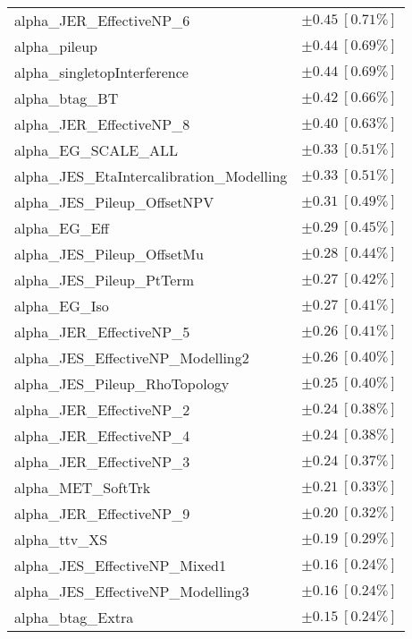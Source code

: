 \begin{table}
\begin{center}
\begin{tabular*}{\textwidth}{@{\extracolsep{\fill}}lc}
alpha\_JER\_EffectiveNP\_6         & $\pm 0.45\ [0.71\%] $       \\
alpha\_pileup         & $\pm 0.44\ [0.69\%] $       \\
alpha\_singletopInterference         & $\pm 0.44\ [0.69\%] $       \\
alpha\_btag\_BT         & $\pm 0.42\ [0.66\%] $       \\
alpha\_JER\_EffectiveNP\_8         & $\pm 0.40\ [0.63\%] $       \\
alpha\_EG\_SCALE\_ALL         & $\pm 0.33\ [0.51\%] $       \\
alpha\_JES\_EtaIntercalibration\_Modelling         & $\pm 0.33\ [0.51\%] $       \\
alpha\_JES\_Pileup\_OffsetNPV         & $\pm 0.31\ [0.49\%] $       \\
alpha\_EG\_Eff         & $\pm 0.29\ [0.45\%] $       \\
alpha\_JES\_Pileup\_OffsetMu         & $\pm 0.28\ [0.44\%] $       \\
alpha\_JES\_Pileup\_PtTerm         & $\pm 0.27\ [0.42\%] $       \\
alpha\_EG\_Iso         & $\pm 0.27\ [0.41\%] $       \\
alpha\_JER\_EffectiveNP\_5         & $\pm 0.26\ [0.41\%] $       \\
alpha\_JES\_EffectiveNP\_Modelling2         & $\pm 0.26\ [0.40\%] $       \\
alpha\_JES\_Pileup\_RhoTopology         & $\pm 0.25\ [0.40\%] $       \\
alpha\_JER\_EffectiveNP\_2         & $\pm 0.24\ [0.38\%] $       \\
alpha\_JER\_EffectiveNP\_4         & $\pm 0.24\ [0.38\%] $       \\
alpha\_JER\_EffectiveNP\_3         & $\pm 0.24\ [0.37\%] $       \\
alpha\_MET\_SoftTrk         & $\pm 0.21\ [0.33\%] $       \\
alpha\_JER\_EffectiveNP\_9         & $\pm 0.20\ [0.32\%] $       \\
alpha\_ttv\_XS         & $\pm 0.19\ [0.29\%] $       \\
alpha\_JES\_EffectiveNP\_Mixed1         & $\pm 0.16\ [0.24\%] $       \\
alpha\_JES\_EffectiveNP\_Modelling3         & $\pm 0.16\ [0.24\%] $       \\
alpha\_btag\_Extra         & $\pm 0.15\ [0.24\%] $       \\

\end{tabular*}
\end{center}
\end{table}
